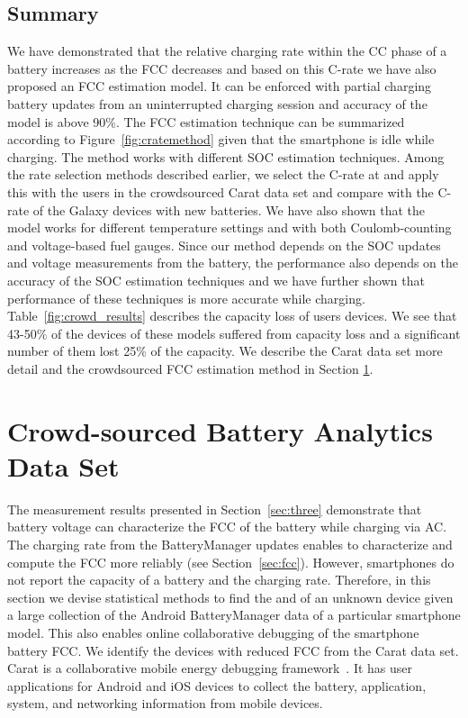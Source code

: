 \documentclass[journal]{IEEEtran}
\begin{document}
\subsection{Summary}
We have demonstrated that the relative charging rate within the CC phase of a battery increases as the FCC decreases and based on this C-rate we have also proposed an FCC estimation model. It can be enforced with partial  charging battery updates from an uninterrupted charging session and accuracy of the model is above 90\%. The FCC estimation technique can be summarized  according to Figure~\ref{fig:cratemethod} given that the smartphone is idle while charging. The method works with different SOC estimation techniques. Among the rate selection methods described earlier, we select the C-rate at  and apply this with the users in the crowdsourced Carat data set and compare with the C-rate of the Galaxy devices with new batteries. We have also shown that the model works for different temperature settings and with both Coulomb-counting  and voltage-based fuel gauges. Since our method depends on the SOC updates and voltage measurements from the battery, the performance also depends on the accuracy of the SOC estimation techniques and we have further shown that performance of these techniques is more accurate while charging. Table~\ref{fig:crowd_results} describes the capacity loss of users devices. We see that 43-50\% of the devices of these models suffered from capacity loss and a significant number of them lost 25\% of the capacity. We describe the Carat data set more detail  and the crowdsourced FCC  estimation method in Section \ref{sec:five}.















\section{Crowd-sourced Battery Analytics Data Set}
\label{sec:five}
The measurement results presented in Section~\ref{sec:three} demonstrate that battery voltage can characterize the FCC of the battery while charging via AC. The charging rate from the BatteryManager updates enables to characterize and compute the FCC more reliably (see Section~\ref{sec:fcc}). However, smartphones  do not report the capacity of a  battery and the charging rate. Therefore, in this section we devise statistical methods to find the  and  of an unknown device given a large collection of the Android BatteryManager data of a particular smartphone model.  This also enables online collaborative debugging of the smartphone battery FCC. We identify the devices with reduced FCC from the Carat data set. Carat is a collaborative mobile energy debugging framework~\cite{Oliner2013}. It has user applications for Android and iOS devices to collect the battery, application, system, and networking information from mobile devices. 
\end{document}

